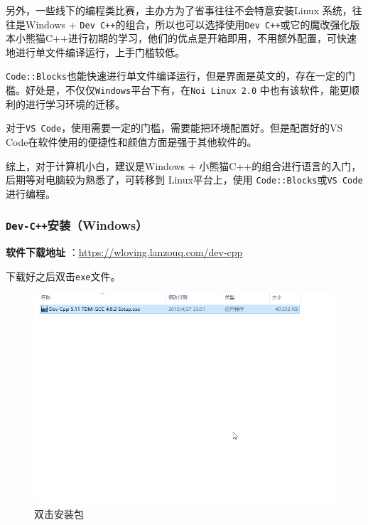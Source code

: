 另外，一些线下的编程类比赛，主办方为了省事往往不会特意安装Linux 系统，往往是Windows + \texttt{Dev C++}的组合，所以也可以选择使用\texttt{Dev C++}或它的魔改强化版本小熊猫C++进行初期的学习，他们的优点是开箱即用，不用额外配置，可快速地进行单文件编译运行，上手门槛较低。

\texttt{Code::Blocks}也能快速进行单文件编译运行，但是界面是英文的，存在一定的门槛。好处是，不仅仅\texttt{Windows}平台下有，在\texttt{Noi Linux 2.0} 中也有该软件，能更顺利的进行学习环境的迁移。

对于\texttt{VS Code}，使用需要一定的门槛，需要能把环境配置好。但是配置好的VS Code在软件使用的便捷性和颜值方面是强于其他软件的。

综上，对于计算机小白，建议是Windows + 小熊猫C++的组合进行语言的入门，后期等对电脑较为熟悉了，可转移到 Linux平台上，使用 \texttt{Code::Blocks}或\texttt{VS Code}进行编程。

\subsubsection{\texttt{Dev-C++}安装（Windows）}
\textbf{软件下载地址} ：\href{https://wloving.lanzouq.com/dev-cpp}{https://wloving.lanzouq.com/dev-cpp}

下载好之后双击\texttt{exe}文件。
\begin{figure}[H]
\centering
\includegraphics[width=0.6\linewidth]{01chapter/img/dev安装01}
\caption{双击安装包}
\label{fig:dev01}
\end{figure}

